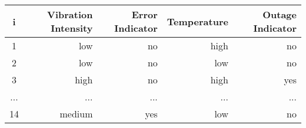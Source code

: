 \begin{tabular}{crrrr}
\toprule
   i & Vibration Intensity & Error Indicator & Temperature & Outage Indicator \\
\midrule
   1 &                 low &              no &        high &               no \\
   2 &                 low &              no &         low &               no \\
   3 &                high &              no &        high &              yes \\
 ... &                 ... &             ... &         ... &              ... \\
  14 &              medium &             yes &         low &               no \\
\bottomrule
\end{tabular}
